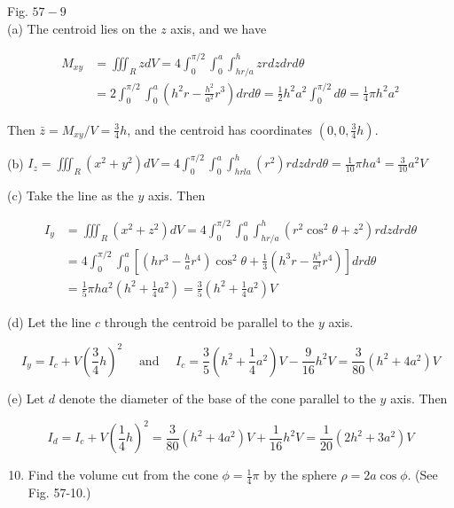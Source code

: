 \documentclass[10pt]{article}
\begin{document}
Fig. $57-9$\\
(a) The centroid lies on the $z$ axis, and we have

$$
\begin{aligned}
M_{x y} & =\iiint_{R} z d V=4 \int_{0}^{\pi / 2} \int_{0}^{a} \int_{h r / a}^{h} z r d z d r d \theta \\
& =2 \int_{0}^{\pi / 2} \int_{0}^{a}\left(h^{2} r-\frac{h^{2}}{a^{2}} r^{3}\right) d r d \theta=\frac{1}{2} h^{2} a^{2} \int_{0}^{\pi / 2} d \theta=\frac{1}{4} \pi h^{2} a^{2}
\end{aligned}
$$

Then $\bar{z}=M_{x y} / V=\frac{3}{4} h$, and the centroid has coordinates $\left(0,0, \frac{3}{4} h\right)$.

(b) $I_{z}=\iiint_{R}\left(x^{2}+y^{2}\right) d V=4 \int_{0}^{\pi / 2} \int_{0}^{a} \int_{h r l a}^{h}\left(r^{2}\right) r d z d r d \theta=\frac{1}{10} \pi h a^{4}=\frac{3}{10} a^{2} V$

(c) Take the line as the $y$ axis. Then

$$
\begin{aligned}
I_{y} & =\iiint_{R}\left(x^{2}+z^{2}\right) d V=4 \int_{0}^{\pi / 2} \int_{0}^{a} \int_{h r / a}^{h}\left(r^{2} \cos ^{2} \theta+z^{2}\right) r d z d r d \theta \\
& =4 \int_{0}^{\pi / 2} \int_{0}^{a}\left[\left(h r^{3}-\frac{h}{a} r^{4}\right) \cos ^{2} \theta+\frac{1}{3}\left(h^{3} r-\frac{h^{3}}{a^{3}} r^{4}\right)\right] d r d \theta \\
& =\frac{1}{5} \pi h a^{2}\left(h^{2}+\frac{1}{4} a^{2}\right)=\frac{3}{5}\left(h^{2}+\frac{1}{4} a^{2}\right) V
\end{aligned}
$$

(d) Let the line $c$ through the centroid be parallel to the $y$ axis.

$$
I_{y}=I_{c}+V\left(\frac{3}{4} h\right)^{2} \quad \text { and } \quad I_{c}=\frac{3}{5}\left(h^{2}+\frac{1}{4} a^{2}\right) V-\frac{9}{16} h^{2} V=\frac{3}{80}\left(h^{2}+4 a^{2}\right) V
$$

(e) Let $d$ denote the diameter of the base of the cone parallel to the $y$ axis. Then

$$
I_{d}=I_{c}+V\left(\frac{1}{4} h\right)^{2}=\frac{3}{80}\left(h^{2}+4 a^{2}\right) V+\frac{1}{16} h^{2} V=\frac{1}{20}\left(2 h^{2}+3 a^{2}\right) V
$$

\begin{enumerate}
  \setcounter{enumi}{9}
  \item Find the volume cut from the cone $\phi=\frac{1}{4} \pi$ by the sphere $\rho=2 a \cos \phi$. (See Fig. 57-10.)
\end{enumerate}
\end{document}
